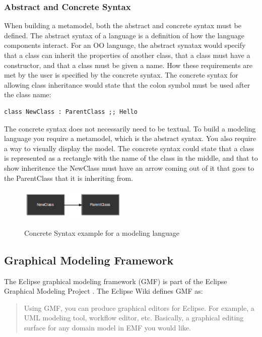 \subsubsection{Abstract and Concrete Syntax}

When building a metamodel, both the abstract and concrete syntax must be defined. The abstract syntax of a language is a definition of how the language components interact. For an OO language, the abstract synatax would specify that a class can inherit the properties of another class, that a class must have a constructor, and that a class must be given a name. How these requirements are met by the user is specified by the concrete syntax. The concrete syntax for allowing class inheritance would state that the colon symbol must be used after the class name:

\begin{lstlisting}
class NewClass : ParentClass ;; Hello
\end{lstlisting}

The concrete syntax does not necessarily need to be textual. To build a modeling language you require a metamodel, which is the abstract syntax. You also require a way to visually display the model. The concrete syntax could state that a class is represented as a rectangle with the name of the class in the middle, and that to show inheritence the NewClass must have an arrow coming out of it that goes to the ParentClass that it is inheriting from.

\begin{figure}[h]
\begin{center}
	\includegraphics[width=2in]{figures/concrete_syntax.png}
	\label{concreteSyntaxFigure}
	\caption{Concrete Syntax example for a modeling language}
\end{center}
\end{figure}

\subsection{Graphical Modeling Framework}

The Eclipse graphical modeling framework (GMF) is part of the Eclipse Graphical Modeling Project \citep{gmpSite}. The Eclipse Wiki \cite{gmpFAQ} defines GMF as:

\begin{quote} Using GMF, you can produce graphical editors for Eclipse. For example, a UML modeling tool, workflow editor, etc. Basically, a graphical editing surface for any domain model in EMF you would like. \end{quote}



